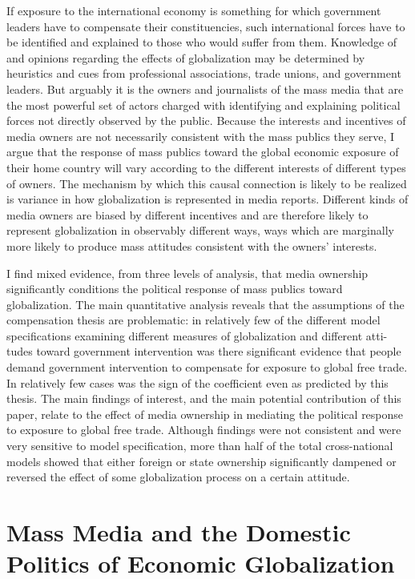 \documentclass[12pt]{report}
\begin{document}
If exposure to the international economy is something for which government leaders have to
compensate their constituencies, such international forces have to be identified and explained to
those who would suffer from them. Knowledge of and opinions regarding the effects of globalization
may be determined by heuristics and cues from professional associations, trade unions, and
government leaders. But arguably it is the owners and journalists of the mass media that are the
most powerful set of actors charged with identifying and explaining political forces not directly
observed by the public. Because the interests and incentives of media owners are not necessarily
consistent with the mass publics they serve, I argue that the response of mass publics toward the
global economic exposure of their home country will vary according to the different interests of
different types of owners. The mechanism by which this causal connection is likely to be realized is
variance in how globalization is represented in media reports. Different kinds of media owners are
biased by different incentives and are therefore likely to represent globalization in observably
different ways, ways which are marginally more likely to produce mass attitudes consistent with the
owners\textquoteright{} interests.

I find mixed evidence, from three levels of analysis, that media ownership significantly conditions
the political response of mass publics toward globalization. The main quantitative analysis reveals
that the assumptions of the compensation thesis are problematic: in relatively few of the different
model specifications examining different measures of globalization and different atti- tudes toward
government intervention was there significant evidence that people demand government intervention to
compensate for exposure to global free trade. In relatively few cases was the sign of the
coefficient even as predicted by this thesis. The main findings of interest, and the main potential
contribution of this paper, relate to the effect of media ownership in mediating the political
response to exposure to global free trade. Although findings were not consistent and were very
sensitive to model specification, more than half of the total cross-national models showed that
either foreign or state ownership significantly dampened or reversed the effect of some
globalization process on a certain attitude.

\chapter{Mass Media and the Domestic Politics of Economic Globalization}
\end{document}
